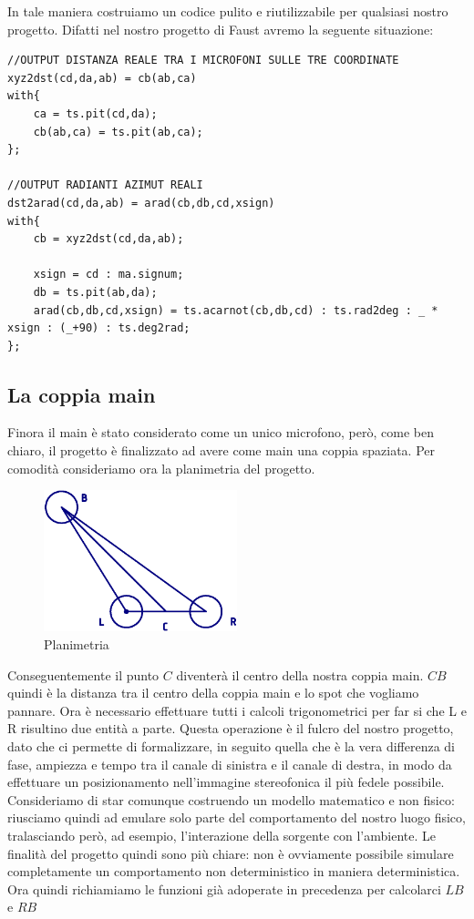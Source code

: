 \documentclass{article}
\begin{document}
    
    In tale maniera costruiamo un codice pulito e riutilizzabile per qualsiasi nostro progetto.
    Difatti nel nostro progetto di Faust avremo la seguente situazione:
    
    \begin{lstlisting}
//OUTPUT DISTANZA REALE TRA I MICROFONI SULLE TRE COORDINATE
xyz2dst(cd,da,ab) = cb(ab,ca)
with{
    ca = ts.pit(cd,da);
    cb(ab,ca) = ts.pit(ab,ca);
};

//OUTPUT RADIANTI AZIMUT REALI
dst2arad(cd,da,ab) = arad(cb,db,cd,xsign)
with{
    cb = xyz2dst(cd,da,ab);

    xsign = cd : ma.signum;
    db = ts.pit(ab,da);
    arad(cb,db,cd,xsign) = ts.acarnot(cb,db,cd) : ts.rad2deg : _ * xsign : (_+90) : ts.deg2rad;
};
    \end{lstlisting}

    \subsection{La coppia main}
    
    Finora il main è stato considerato come un unico microfono, però, come ben chiaro, il progetto è finalizzato ad avere come main una coppia spaziata. Per comodità consideriamo ora la planimetria del progetto.

    \begin{figure}[H]
        \centering
        \includegraphics[width=0.5\textwidth]{images/PLANIMETRIA.png}
         \caption{\label{fig2}Planimetria}
    \end{figure}

    Conseguentemente il punto $C$ diventerà il centro della nostra coppia main. $CB$ quindi è la distanza tra il centro della coppia main e lo spot che vogliamo pannare.
    Ora è necessario effettuare tutti i calcoli trigonometrici per far si che L e R risultino due entità a parte. Questa operazione è il fulcro del nostro progetto, dato che ci permette di formalizzare, in seguito quella che è la vera differenza di fase, ampiezza e tempo tra il canale di sinistra e il canale di destra, in modo da effettuare un posizionamento nell'immagine stereofonica il più fedele possibile. Consideriamo di star comunque costruendo un modello matematico e non fisico: riusciamo quindi ad emulare solo parte del comportamento del nostro luogo fisico, tralasciando però, ad esempio, l'interazione della sorgente con l'ambiente. Le finalità del progetto quindi sono più chiare: non è ovviamente possibile simulare completamente un comportamento non deterministico in maniera deterministica.
    Ora quindi richiamiamo le funzioni già adoperate in precedenza per calcolarci $LB$ e $RB$ \\
    
\end{document}
